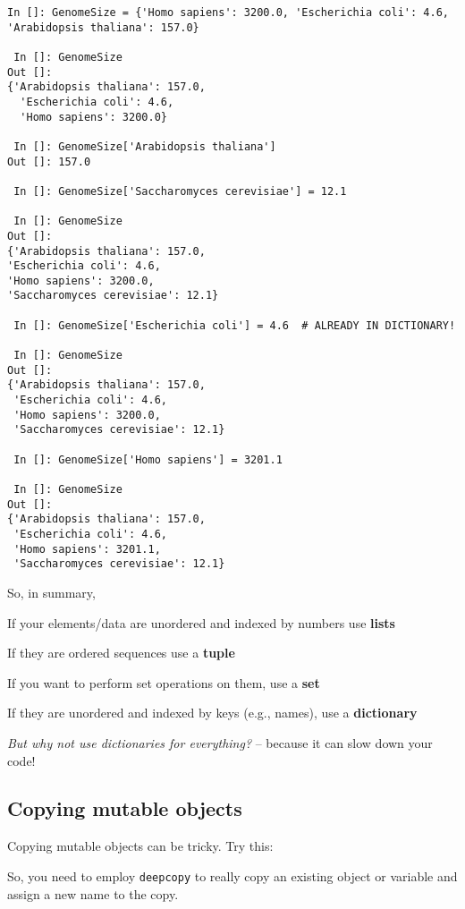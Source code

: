 \begin{lstlisting} 
In []: GenomeSize = {'Homo sapiens': 3200.0, 'Escherichia coli': 4.6,
'Arabidopsis thaliana': 157.0}

 In []: GenomeSize
Out []: 
{'Arabidopsis thaliana': 157.0,
  'Escherichia coli': 4.6,
  'Homo sapiens': 3200.0}

 In []: GenomeSize['Arabidopsis thaliana']
Out []: 157.0

 In []: GenomeSize['Saccharomyces cerevisiae'] = 12.1

 In []: GenomeSize
Out []: 
{'Arabidopsis thaliana': 157.0,
'Escherichia coli': 4.6,
'Homo sapiens': 3200.0,
'Saccharomyces cerevisiae': 12.1}

 In []: GenomeSize['Escherichia coli'] = 4.6  # ALREADY IN DICTIONARY!

 In []: GenomeSize
Out []: 
{'Arabidopsis thaliana': 157.0,
 'Escherichia coli': 4.6,
 'Homo sapiens': 3200.0,
 'Saccharomyces cerevisiae': 12.1}

 In []: GenomeSize['Homo sapiens'] = 3201.1

 In []: GenomeSize
Out []: 
{'Arabidopsis thaliana': 157.0,
 'Escherichia coli': 4.6,
 'Homo sapiens': 3201.1,
 'Saccharomyces cerevisiae': 12.1} 
\end{lstlisting}

So, in summary, 
\begin{compactitem} \itemsep10pt
	\item  If your elements/data are unordered and indexed by numbers use 
	{\bf lists}
  \item  If they are ordered sequences use a {\bf tuple} 
	\item  If you want to perform set operations on them, use a {\bf set}
	\item  If they are unordered and indexed by keys (e.g., names), use a 
	{\bf dictionary}
\end{compactitem}

{\it But why not use dictionaries for everything?} -- because it can 
slow down your code!

\subsection{Copying mutable objects}

Copying mutable objects can be tricky. Try this:



So, you need to employ {\tt deepcopy} to really copy an existing object 
or variable and assign a new name to the copy. 

